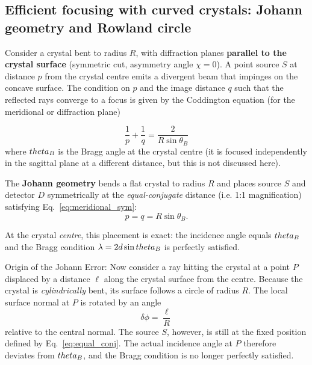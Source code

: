 \subsection{Efficient focusing with curved crystals: Johann geometry and Rowland circle}

Consider a crystal bent to radius $R$, with diffraction planes \textbf{parallel to the
crystal surface} (symmetric cut, asymmetry angle $\chi = 0$).  A point source $S$ at
distance $p$ from the crystal centre emits a divergent beam that impinges on the concave
surface.  The condition on $p$ and the image distance $q$ such that the reflected
rays converge to a focus is given by the Coddington equation (for the meridional or diffraction plane)


\begin{equation}
  \frac{1}{p} + \frac{1}{q} = \frac{2}{R\sin\theta_B}
  \label{eq:meridional_sym}
\end{equation}
where
$\\theta_B$ is the Bragg angle at the crystal centre (it is focused independently in the sagittal plane at a different distance, but this is not discussed here).

The \textbf{Johann geometry} bends a flat crystal to radius $R$ and places source $S$ and
detector $D$ symmetrically at the \emph{equal-conjugate} distance (i.e. 1:1 magnification) satisfying Eq.~\eqref{eq:meridional_sym}:
\begin{equation}
  p = q = R\sin\theta_B.
  \label{eq:equal_conj}
\end{equation}

At the crystal \emph{centre}, this placement is exact: the incidence angle equals $\\theta_B$
and the Bragg condition $\lambda = 2d\sin\\theta_B$ is perfectly satisfied.

Origin of the Johann Error: 
Now consider a ray hitting the crystal at a point $P$ displaced by a distance $\ell$ along
the crystal surface from the centre.  Because the crystal is \emph{cylindrically} bent, its
surface follows a circle of radius $R$.  The local surface normal at $P$ is rotated by an
angle
\begin{equation}
  \delta\phi = \frac{\ell}{R}
  \label{eq:normal_rotation}
\end{equation}
relative to the central normal.  The source $S$, however, is still at the fixed position
defined by Eq.~\eqref{eq:equal_conj}.  The actual incidence angle at $P$ therefore deviates
from $\\theta_B$, and the Bragg condition is no longer perfectly satisfied.

